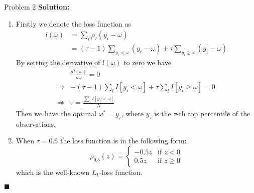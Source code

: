 \documentclass{article}
\newenvironment{solution}                               %
{\textbf{Solution:} }{$\blacksquare$}                   %
\begin{document}
\begin{section}{Problem 2}
        \begin{solution}
            \begin{enumerate}[label=(\alph*)]
                \item %
                Firstly we denote the loss function as 
                \begin{align*}
                    l(\omega) &= \sum_{i} \rho_\tau (y_i - \omega) \\
                    &= (\tau - 1) \sum_{y_i < \omega} (y_i - \omega)
                        + \tau \sum_{y_i \geq \omega} (y_i - \omega)
                \end{align*}
                By setting the derivative of $l(\omega)$ to zero we have
                \begin{align*}
                    & \frac{d l(\omega)}{d \omega} = 0 \\
                    \Rightarrow & -(\tau-1)\sum_{i} I[y_i < \omega] + \tau \sum_{i} I[y_i \geq \omega] = 0 \\
                    \Rightarrow & \tau = \frac{\sum_{i} I[y_i < \omega]}{N}
                \end{align*}
                Then we have the optimal $\omega^* = y_\tau$, where $y_\tau$ is the $\tau$-th top percentile of the observations.

                \item %
                When $\tau=0.5$ the loss function is in the following form:
                $$
                    \rho_{0.5}(z) = \begin{cases}
                        -0.5z & \text{if $z < 0$} \\
                        0.5z & \text{if $z \geq 0$}
                    \end{cases}
                $$
                which is the well-known $L_1$-loss function.
                
            \end{enumerate}
        \end{solution}


\end{section}
\end{document}
